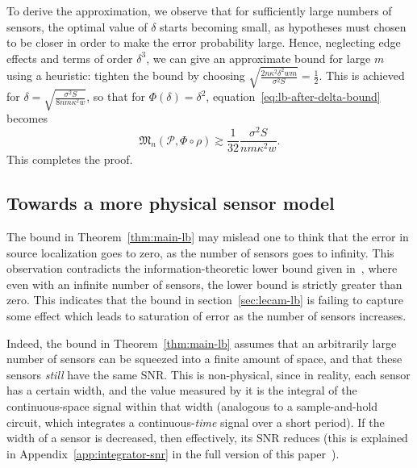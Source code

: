 \documentclass[conference,letterpaper]{IEEEtran}
\newcommand{\Phiorho}{\Phi\!\circ\!\rho}
\begin{document}
\begin{IEEEproof}
To derive the approximation, we observe that for sufficiently large numbers of
sensors, the optimal value of $\delta$ starts becoming small, as hypotheses
must chosen to be closer in order to make the error probability large. Hence,
neglecting edge effects and terms of order $\delta^3$, we can give an
approximate bound for large $m$ using a heuristic: tighten the bound by
choosing $\sqrt{\frac{2n\kappa^2\delta^2wm}{\sigma^2 S}} = \frac{1}{2}$. This
is achieved for $\delta = \sqrt{\frac{\sigma^2 S}{8nm\kappa^2 w}}$, so that for
$\Phi(\delta) = \delta^2$, equation~\eqref{eq:lb-after-delta-bound} becomes
\begin{equation}
	\mathfrak{M}_n(\mathcal{P}, \Phiorho) \gtrsim \frac{1}{32} \frac{\sigma^2 S}{nm\kappa^2 w}.
\end{equation}
This completes the proof.
\end{IEEEproof}

\subsection{Towards a more physical sensor model}
\label{sec:physical-model}

The bound in Theorem~\ref{thm:main-lb} may mislead one to think that the error
in source localization goes to zero, as the number of sensors goes to infinity.
This observation contradicts the information-theoretic lower bound given
in~\cite{Grover2016Fundamental}, where even with an infinite number of sensors,
the lower bound is strictly greater than zero. This indicates that the bound in
section~\ref{sec:lecam-lb} is failing to capture some effect which leads to
saturation of error as the number of sensors increases.

Indeed, the bound in Theorem~\ref{thm:main-lb} assumes that an arbitrarily
large number of sensors can be squeezed into a finite amount of space, and that
these sensors \emph{still} have the same SNR.  This is non-physical, since in
reality, each sensor has a certain width, and the value measured by it is the
integral of the continuous-space signal within that width (analogous to a
sample-and-hold circuit, which integrates a continuous-\emph{time} signal over
a short period). If the width of a sensor is decreased, then effectively, its
SNR reduces (this is explained in Appendix~\ref{app:integrator-snr} in the
full version of this paper~\cite{FullVersion}).

\end{document}
